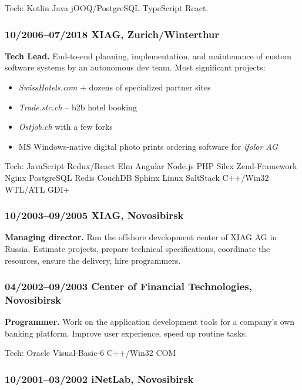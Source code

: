 \documentclass[a4paper, twocolumn, 10pt]{article}
\begin{document}
Tech: Kotlin Java jOOQ/PostgreSQL TypeScript React.

\subsubsection*{10/2006--07/2018 XIAG, Zurich/Winterthur}

\textbf{Tech Lead.} End-to-end planning, implementation, and maintenance of custom
software systems by an autonomous dev team. Most significant projects:

\begin{itemize}
  \itemsep0em
  \item \emph{SwissHotels.com} + dozens of specialized partner sites
  \item \emph{Trade.stc.ch} -- b2b hotel booking
  \item \emph{Ostjob.ch} with a few forks
  \item MS Windows-native digital photo prints ordering software for \emph{ifolor AG}
\end{itemize}

Tech: JavaScript Redux/React Elm Angular Node.js PHP Silex Zend-Framework Nginx PostgreSQL
Redis CouchDB Sphinx Linux SaltStack C++/Win32 WTL/ATL GDI+

\subsubsection*{10/2003--09/2005 XIAG, Novosibirsk}

\textbf{Managing director.} Run the offshore development center of XIAG AG in
Russia. Estimate projects, prepare technical specifications, coordinate the resources, ensure the
delivery, hire programmers.

\subsubsection*{04/2002--09/2003 Center of Financial Technologies, Novosibirsk}

\textbf{Programmer.} Work on the application development tools for a company's own banking
platform. Improve user experience, speed up routine tasks.

Tech: Oracle Visual-Basic-6 C++/Win32 COM

\subsubsection*{10/2001--03/2002 iNetLab, Novosibirsk}
\end{document}
